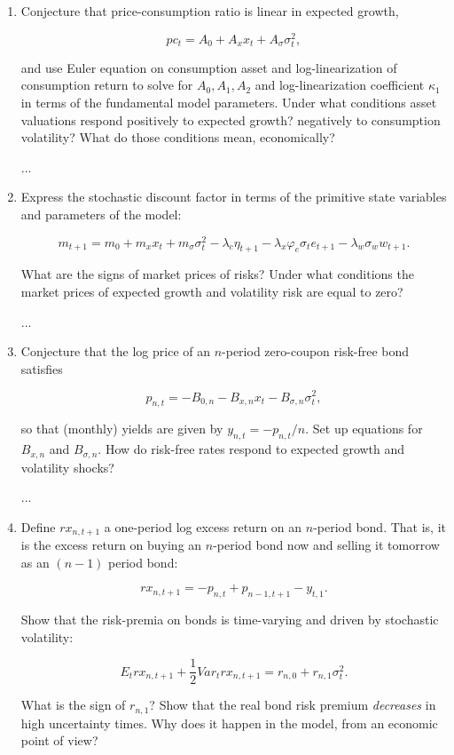 \documentclass{article}
\begin{document}
\begin{enumerate}

\item Conjecture that price-consumption ratio is linear in expected growth,

$$
pc_t = A_0 + A_xx_t + A_\sigma \sigma_t^2,
$$

and use Euler equation on consumption asset and log-linearization of consumption return to solve for $A_0,A_1,A_2$ and log-linearization coefficient $\kappa_1$ in terms of the fundamental model parameters. Under what conditions asset valuations respond positively to expected growth? negatively to consumption volatility? What do those conditions mean, economically?

...

\item Express the stochastic discount factor in terms of the primitive state variables and parameters of the model:

$$
m_{t+1} = m_0 + m_x x_t + m_\sigma \sigma_t^2 - \lambda_c \eta_{t+1} - \lambda_x \varphi_e \sigma_t e_{t+1} - \lambda_w \sigma_w w_{t+1}.
$$

What are the signs of market prices of risks? Under what conditions the market prices of expected growth and volatility risk are equal to zero?

...

\item Conjecture that the log price of an $n$-period zero-coupon risk-free bond satisfies

$$
p_{n,t} = - B_{0, n} - B_{x,n} x_t - B_{\sigma,n} \sigma_t^2,
$$

so that (monthly) yields are given by $y_{n,t} = -p_{n,t}/n$. Set up equations for $B_{x,n}$ and $B_{\sigma,n}$. How do risk-free rates respond to expected growth and volatility shocks?

...

\item Define $rx_{n,t+1}$ a one-period log excess return on an $n$-period bond. That is, it is the excess return on buying an $n$-period bond now and selling it tomorrow as an $(n - 1)$ period bond:

$$
rx_{n,t+1} = -p_{n,t} + p_{n-1,t+1} - y_{t,1}.
$$

Show that the risk-premia on bonds is time-varying and driven by stochastic volatility:

$$
E_t r x_{n,t+1} + \frac{1}{2}Var_t r x_{n,t+1} = r_{n,0} + r_{n,1} \sigma_t^2.
$$

What is the sign of $r_{n,1}$? Show that the real bond risk premium \textit{decreases} in high uncertainty times. Why does it happen in the model, from an economic point of view?


\end{enumerate}
\end{document}
